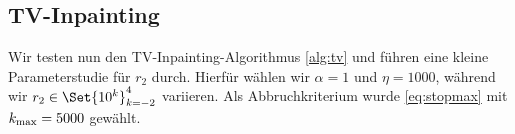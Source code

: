 \documentclass{mythesis}
\begin{document}

\subsection*{TV-Inpainting}

Wir testen nun den TV-Inpainting-Algorithmus \ref{alg:tv} und führen eine kleine Parameterstudie für $r_2$ durch.
Hierfür wählen wir $\alpha = 1$ und $\eta = 1000$, während wir $r_2 \in \Set{10^k}_{k=-2}^4$ variieren.
Als Abbruchkriterium wurde \eqref{eq:stopmax} mit $k_{\mathrm{max}} = 5000$ gewählt.

\end{document}
